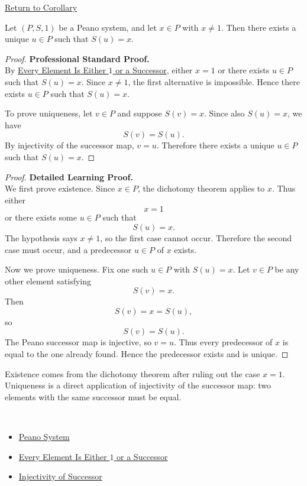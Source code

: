 \newpage
{}
\label{prf:predecessor-exists-unique-away-from-one}

\begin{remark*}[Return]
\hyperref[cor:predecessor-exists-unique-away-from-one]{Return to Corollary}
\end{remark*}

\begin{corollary*}
Let $(P,S,1)$ be a Peano system, and let $x \in P$ with $x \neq 1$. Then
there exists a unique $u \in P$ such that $S(u)=x$.
\end{corollary*}

\begin{proof}
\textbf{Professional Standard Proof.}~\\
By
\hyperref[thm:every-element-is-one-or-a-successor]{Every Element Is Either
$1$ or a Successor}, either $x=1$ or there exists $u\in P$ such that
$S(u)=x$. Since $x\neq 1$, the first alternative is impossible. Hence there
exists $u\in P$ such that $S(u)=x$.

To prove uniqueness, let $v\in P$ and suppose $S(v)=x$. Since also $S(u)=x$,
we have
\[
S(v)=S(u).
\]
By injectivity of the successor map, $v=u$. Therefore there exists a unique
$u\in P$ such that $S(u)=x$.
\end{proof}

\begin{proof}
\textbf{Detailed Learning Proof.}~\\
We first prove existence. Since $x\in P$, the dichotomy theorem applies to
$x$. Thus either
\[
x=1
\]
or there exists some $u\in P$ such that
\[
S(u)=x.
\]
The hypothesis says $x\neq 1$, so the first case cannot occur. Therefore the
second case must occur, and a predecessor $u\in P$ of $x$ exists.

Now we prove uniqueness. Fix one such $u\in P$ with $S(u)=x$. Let
$v\in P$ be any other element satisfying
\[
S(v)=x.
\]
Then
\[
S(v)=x=S(u),
\]
so
\[
S(v)=S(u).
\]
The Peano successor map is injective, so $v=u$. Thus every predecessor of
$x$ is equal to the one already found. Hence the predecessor exists and is
unique.
\end{proof}

\begin{remark*}
Existence comes from the dichotomy theorem after ruling out the case $x=1$.
Uniqueness is a direct application of injectivity of the successor map: two
elements with the same successor must be equal.
\end{remark*}

\begin{remark*}[Dependencies]~\\
\begin{itemize}
  \item \hyperref[def:peano-system]{Peano System}
  \item \hyperref[thm:every-element-is-one-or-a-successor]{Every Element Is Either $1$ or a Successor}
  \item \hyperref[ax:peano-successor-injective]{Injectivity of Successor}
\end{itemize}
\end{remark*}
